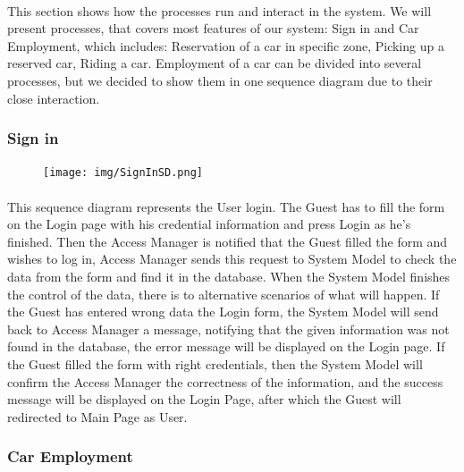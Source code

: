 	
		\paragraph{} This section shows how the processes run and interact in the system. 
		We will present processes, that covers most features of our system: Sign in and Car Employment, which includes: Reservation of a car in specific zone, Picking up a reserved car, Riding a car. Employment of a car can be divided into several processes, but we decided to show them in one sequence diagram due to their close interaction.    

	\subsubsection{Sign in}	
		\begin{figure}[h]
			\texttt{[image: img/SignInSD.png]}
		\end{figure}
		
		\paragraph{} This sequence diagram represents the User login. 
		The Guest has to fill the form on the Login page with his credential information and press Login as he's finished. 
		Then the Access Manager is notified that the Guest filled the form and wishes to log in, Access Manager sends this request to System Model to check the data from the form and find it in the database. When the System Model finishes the control of the data, there is to alternative scenarios of what will happen. 
		If the Guest has entered wrong data the Login form, the System Model will send back to Access Manager a message, notifying that the given information was not found in the database, the error message will be displayed on the Login page. 
		If the Guest filled the form with right credentials, then the System Model will confirm the Access Manager the correctness of the information, and the success message will be displayed on the Login Page, after which the Guest will redirected to Main Page as User.           
			
	\newpage
	\subsubsection{Car Employment}	
	
